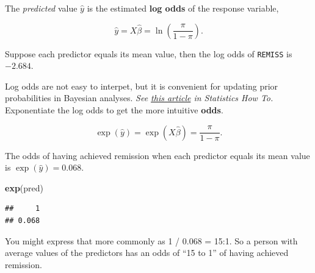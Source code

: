 \documentclass[
]{book}
\newenvironment{Shaded}{\begin{snugshade}}{\end{snugshade}}
\newcommand{\DataTypeTok}[1]{\textcolor[rgb]{0.13,0.29,0.53}{#1}}
\newcommand{\KeywordTok}[1]{\textcolor[rgb]{0.13,0.29,0.53}{\textbf{#1}}}
\newcommand{\NormalTok}[1]{#1}
\newcommand{\OperatorTok}[1]{\textcolor[rgb]{0.81,0.36,0.00}{\textbf{#1}}}
\newcommand{\StringTok}[1]{\textcolor[rgb]{0.31,0.60,0.02}{#1}}
\begin{document}
The \emph{predicted} value \(\hat{y}\) is the estimated \textbf{log odds} of the response variable,

\[\hat{y} = X \hat{\beta} = \ln (\frac{\pi}{1 - \pi}).\]

Suppose each predictor equals its mean value, then the log odds of \texttt{REMISS} is \(-2.684\).

\begin{Shaded}
\end{Shaded}

Log odds are not easy to interpet, but it is convenient for updating prior probabilities in Bayesian analyses. \emph{See \href{https://www.statisticshowto.datasciencecentral.com/log-odds/}{this article} in Statistics How To.} Exponentiate the log odds to get the more intuitive \textbf{odds}.

\[\exp (\hat{y}) = \exp (X \hat{\beta}) = \frac{\pi}{1 - \pi}.\]

The odds of having achieved remission when each predictor equals its mean value is \(\exp(\hat{y}) = 0.068\).

\begin{Shaded}
\begin{Highlighting}[]
\KeywordTok{exp}\NormalTok{(pred)}
\end{Highlighting}
\end{Shaded}

\begin{verbatim}
##     1 
## 0.068
\end{verbatim}

You might express that more commonly as 1 / 0.068 = 15:1. So a person with average values of the predictors has an odds of ``15 to 1'' of having achieved remission.
\end{document}
